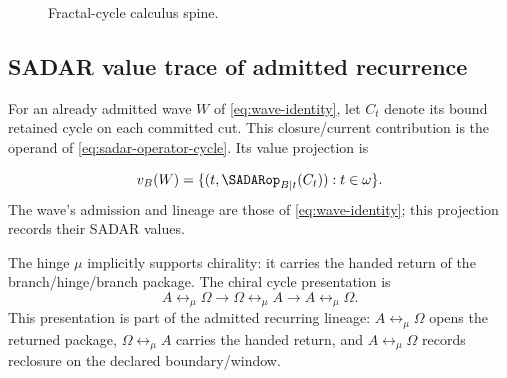 \begin{figure}[H]
\centering
{}
\caption{Fractal-cycle calculus spine.}
\label{fig:fractal-calculus-spine}
\end{figure}

\subsection{SADAR value trace of admitted recurrence}
\label{subsec:cycle-wave-identity}
For an already admitted wave \(W\) of \eqref{eq:wave-identity}, let \(C_t\)
denote its bound retained cycle on each committed cut. This closure/current
contribution is the operand of \eqref{eq:sadar-operator-cycle}. Its value
projection is

\begin{equation}
v_B(W)=\{(t,\SADARop_{B|t}(C_t)):t\in\omega\}.
\label{eq:wave-sadar-presentation}
\end{equation}
The wave's admission and lineage are those of \eqref{eq:wave-identity}; this
projection records their SADAR values.

The hinge \(\mu\) implicitly supports chirality: it carries the handed return of the branch/hinge/branch package. The chiral cycle presentation is
\begin{equation}
A\leftrightarrow_{\mu}\Omega\rightarrow\Omega\leftrightarrow_{\mu}A\rightarrow A\leftrightarrow_{\mu}\Omega.
\label{eq:ao-chiral-cycle-presentation}
\end{equation}
This presentation is part of the admitted recurring lineage: \(A\leftrightarrow_{\mu}\Omega\) opens the returned package, \(\Omega\leftrightarrow_{\mu}A\) carries the handed return, and \(A\leftrightarrow_{\mu}\Omega\) records reclosure on the declared boundary/window.

